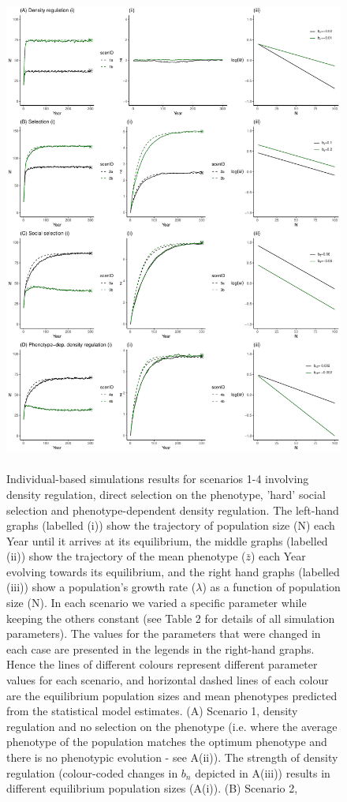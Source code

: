 \documentclass{article}
\begin{document}
\newpage
\begin{figure} [H]
	\centering
	\includegraphics[width=12cm, height=16cm]{Figures/Fig3.pdf}
	\caption{Individual-based simulations results for scenarios 1-4 involving density regulation, direct selection on the phenotype, 'hard' social selection and phenotype-dependent density regulation. The left-hand graphs (labelled (i)) show the trajectory of population size (N) each Year until it arrives at its equilibrium, the middle graphs (labelled (ii)) show the trajectory of the mean phenotype ($\bar{z}$) each Year evolving towards its equilibrium, and the right hand graphs (labelled (iii)) show a population's growth rate ($\lambda$) as a function of population size (N). In each scenario we varied a specific parameter while keeping the others constant (see Table 2 for details of all simulation parameters). The values for the parameters that were changed in each case are presented in the legends in the right-hand graphs. Hence the lines of different colours represent different parameter values for each scenario, and horizontal dashed lines of each colour are the equilibrium population sizes and mean phenotypes predicted from the statistical model estimates. (A) Scenario 1, density regulation and no selection on the phenotype (i.e. where the average phenotype of the population matches the optimum phenotype and there is no phenotypic evolution - see A(ii)). The strength of density regulation (colour-coded changes in $b_n$ depicted in A(iii)) results in different equilibrium population sizes (A(i)). (B) Scenario 2, 
}
\end{figure}
\end{document}
